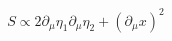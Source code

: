 \begin{equation}
S\propto 2\partial_\mu\eta_1\partial_\mu\eta_2+ (\partial_\mu x)^2
\end{equation}

